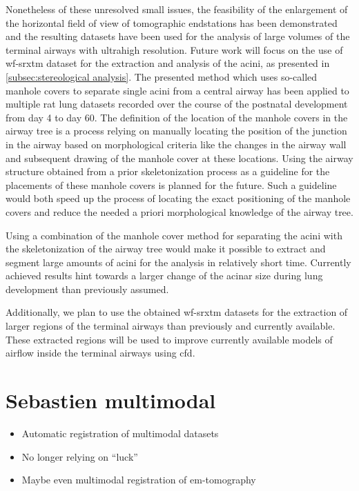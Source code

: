 Nonetheless of these unresolved small issues, the feasibility of the enlargement of the horizontal field of view of tomographic endstations has been demonstrated and the resulting datasets have been used for the analysis of large volumes of the terminal airways with ultrahigh resolution. Future work will focus on the use of \ac{wf-srxtm} dataset for the extraction and analysis of the acini, as presented in \autoref{subsec:stereological analysis}. The presented method which uses so-called manhole covers to separate single acini from a central airway has been applied to multiple rat lung datasets recorded over the course of the postnatal development from day 4 to day 60. The definition of the location of the manhole covers in the airway tree is a process relying on manually locating the position of the junction in the airway based on morphological criteria like the changes in the airway wall and subsequent drawing of the manhole cover at these locations. Using the airway structure obtained from a prior skeletonization process as a guideline for the placements of these manhole covers is planned for the future. Such a guideline would both speed up the process of locating the exact positioning of the manhole covers and reduce the needed a priori morphological knowledge of the airway tree.

Using a combination of the manhole cover method for separating the acini with the skeletonization of the airway tree would make it possible to extract and segment large amounts of acini for the analysis in relatively short time. Currently achieved results hint towards a larger change of the acinar size during lung development than previously assumed.

Additionally, we plan to use the obtained \ac{wf-srxtm} datasets for the extraction of larger regions of the terminal airways than previously and currently available. These extracted regions will be used to improve currently available models of airflow inside the terminal airways \cite{Sznitman2007,Sznitman2009}  using \ac{cfd}.

\section{Sebastien multimodal}
\begin{itemize}
	\item Automatic registration of multimodal datasets
	\item No longer relying on ``luck''
	\item Maybe even multimodal registration of \ac{em}-tomography
\end{itemize}

